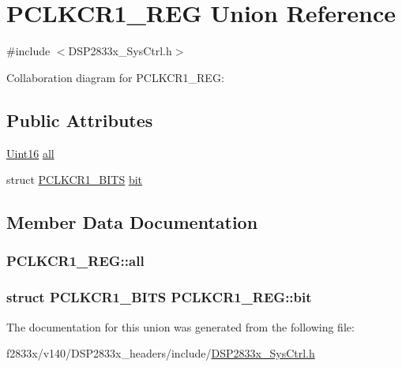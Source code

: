 \hypertarget{union_p_c_l_k_c_r1___r_e_g}{}\section{P\+C\+L\+K\+C\+R1\+\_\+\+R\+E\+G Union Reference}
\label{union_p_c_l_k_c_r1___r_e_g}


{\ttfamily \#include $<$D\+S\+P2833x\+\_\+\+Sys\+Ctrl.\+h$>$}



Collaboration diagram for P\+C\+L\+K\+C\+R1\+\_\+\+R\+E\+G\+:
\subsection*{Public Attributes}
\begin{DoxyCompactItemize}
\item 
\hyperlink{_d_s_p2833x___device_8h_a59a9f6be4562c327cbfb4f7e8e18f08b}{Uint16} \hyperlink{union_p_c_l_k_c_r1___r_e_g_a926e917c0816d350e59b322430bf4671}{all}
\item 
struct \hyperlink{struct_p_c_l_k_c_r1___b_i_t_s}{P\+C\+L\+K\+C\+R1\+\_\+\+B\+I\+T\+S} \hyperlink{union_p_c_l_k_c_r1___r_e_g_a0a537e89c134df8729cb1eea2b2128d8}{bit}
\end{DoxyCompactItemize}


\subsection{Member Data Documentation}
\hypertarget{union_p_c_l_k_c_r1___r_e_g_a926e917c0816d350e59b322430bf4671}{}
\subsubsection[{all}]{ P\+C\+L\+K\+C\+R1\+\_\+\+R\+E\+G\+::all}\label{union_p_c_l_k_c_r1___r_e_g_a926e917c0816d350e59b322430bf4671}
\hypertarget{union_p_c_l_k_c_r1___r_e_g_a0a537e89c134df8729cb1eea2b2128d8}{}
\subsubsection[{bit}]{\setlength{\rightskip}{0pt plus 5cm}struct {\bf P\+C\+L\+K\+C\+R1\+\_\+\+B\+I\+T\+S} P\+C\+L\+K\+C\+R1\+\_\+\+R\+E\+G\+::bit}\label{union_p_c_l_k_c_r1___r_e_g_a0a537e89c134df8729cb1eea2b2128d8}


The documentation for this union was generated from the following file\+:\begin{DoxyCompactItemize}
\item 
f2833x/v140/\+D\+S\+P2833x\+\_\+headers/include/\hyperlink{_d_s_p2833x___sys_ctrl_8h}{D\+S\+P2833x\+\_\+\+Sys\+Ctrl.\+h}\end{DoxyCompactItemize}
